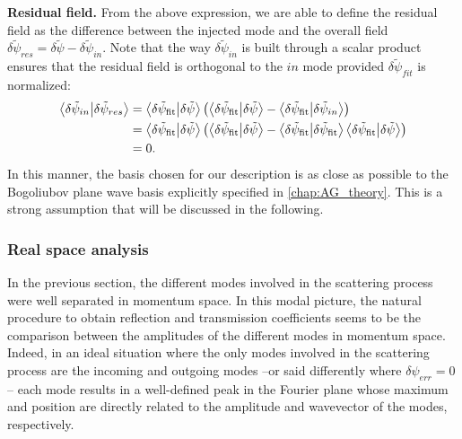 \bigskip 

\textbf{Residual field.} From the above expression, we are able to define the residual field as the difference between the injected mode and the overall field $\delta \tilde{\psi}_{res} = \delta \tilde{\psi}-\delta \tilde{\psi}_{in}$. 
Note that the way $\delta \tilde{\psi}_{in}$ is built through a scalar product ensures that the residual field is orthogonal to the $in$ mode provided $\delta \tilde{\psi}_{fit}$ is normalized:
\begin{equation}
    \begin{aligned}
    \bra{\delta \tilde{\psi}_{in}}\ket{\delta \tilde{\psi}_{res}} &=\bra{\delta \tilde{\psi}_{\mathrm{fit}}}\ket{\delta \tilde{\psi}} \left(\bra{\delta \tilde{\psi}_{\mathrm{fit}}}\ket{\delta \tilde{\psi}} - \bra{\delta \tilde{\psi}_{\mathrm{fit}}}\ket{\delta \tilde{\psi}_{in}}\right)\\
    &= \bra{\delta \tilde{\psi}_{\mathrm{fit}}}\ket{\delta \tilde{\psi}} \left(\bra{\delta \tilde{\psi}_{\mathrm{fit}}}\ket{\delta \tilde{\psi}}-\bra{\delta \tilde{\psi}_{\mathrm{fit}}}\ket{\delta \tilde{\psi}_{\mathrm{fit}}}\bra{\delta \tilde{\psi}_{\mathrm{fit}}}\ket{\delta \tilde{\psi}}\right)\\
    &=0.
    \end{aligned}
\end{equation}
In this manner, the basis chosen for our description is as close as possible to the Bogoliubov plane wave basis explicitly specified in \autoref{chap:AG_theory}. This is a strong assumption that will be discussed in the following. 


\subsubsection{Real space analysis}
In the previous section, the different modes involved in the scattering process were well separated in momentum space. In this modal picture, the natural procedure to obtain reflection and transmission coefficients seems
to be the comparison between the amplitudes of the different modes in momentum space. Indeed, in an ideal situation where the only modes involved in the scattering process are the incoming and outgoing modes --or said differently where $\delta\psi_{err}=0$-- each mode results in a well-defined peak in the Fourier plane whose maximum and position are directly related to the amplitude and wavevector of the modes, respectively. 


